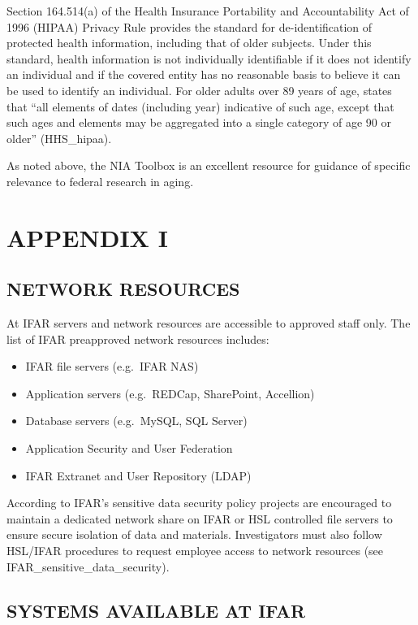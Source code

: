 \documentclass[]{book}
\begin{document}
Section 164.514(a) of the Health Insurance Portability and
Accountability Act of 1996 (HIPAA) Privacy Rule provides the standard
for de-identification of protected health information, including that of
older subjects. Under this standard, health information is not
individually identifiable if it does not identify an individual and if
the covered entity has no reasonable basis to believe it can be used to
identify an individual. For older adults over 89 years of age, states
that ``all elements of dates (including year) indicative of such age,
except that such ages and elements may be aggregated into a single
category of age 90 or older'' (HHS\_hipaa).

As noted above, the NIA Toolbox is an excellent resource for guidance of
specific relevance to federal research in aging.

\section{APPENDIX I}\label{appendix-i}

\subsection{NETWORK RESOURCES}\label{network-resources}

At IFAR servers and network resources are accessible to approved staff
only. The list of IFAR preapproved network resources includes:

\begin{itemize}
\item
  IFAR file servers (e.g.~IFAR NAS)
\item
  Application servers (e.g.~REDCap, SharePoint, Accellion)
\item
  Database servers (e.g.~MySQL, SQL Server)
\item
  Application Security and User Federation
\item
  IFAR Extranet and User Repository (LDAP)
\end{itemize}

According to IFAR's sensitive data security policy projects are
encouraged to maintain a dedicated network share on IFAR or HSL
controlled file servers to ensure secure isolation of data and
materials. Investigators must also follow HSL/IFAR procedures to request
employee access to network resources (see
IFAR\_sensitive\_data\_security).

\hypertarget{systems-available-at-ifar}{\subsection{SYSTEMS AVAILABLE AT
IFAR}\label{systems-available-at-ifar}}
\end{document}
